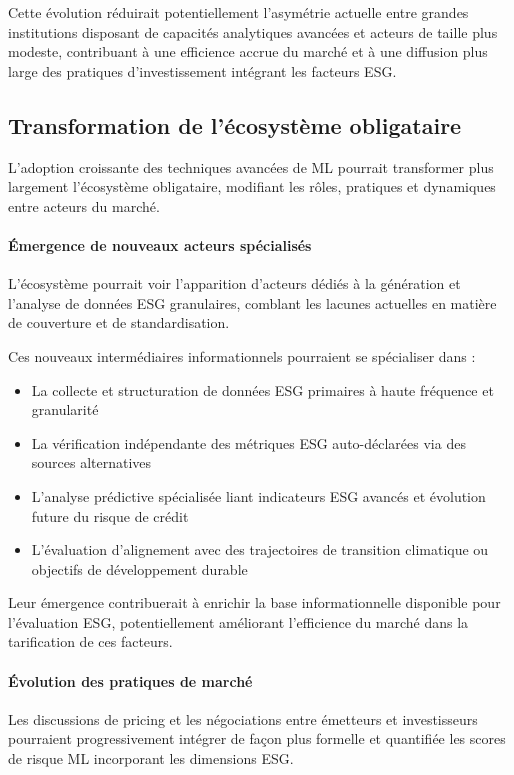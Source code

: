 Cette évolution réduirait potentiellement l'asymétrie actuelle entre grandes institutions disposant de capacités analytiques avancées et acteurs de taille plus modeste, contribuant à une efficience accrue du marché et à une diffusion plus large des pratiques d'investissement intégrant les facteurs ESG.

\subsection*{Transformation de l'écosystème obligataire}

L'adoption croissante des techniques avancées de ML pourrait transformer plus largement l'écosystème obligataire, modifiant les rôles, pratiques et dynamiques entre acteurs du marché.

\paragraph{Émergence de nouveaux acteurs spécialisés} 
L'écosystème pourrait voir l'apparition d'acteurs dédiés à la génération et l'analyse de données ESG granulaires, comblant les lacunes actuelles en matière de couverture et de standardisation.

Ces nouveaux intermédiaires informationnels pourraient se spécialiser dans :
\begin{itemize}
    \item La collecte et structuration de données ESG primaires à haute fréquence et granularité
    \item La vérification indépendante des métriques ESG auto-déclarées via des sources alternatives
    \item L'analyse prédictive spécialisée liant indicateurs ESG avancés et évolution future du risque de crédit
    \item L'évaluation d'alignement avec des trajectoires de transition climatique ou objectifs de développement durable
\end{itemize}

Leur émergence contribuerait à enrichir la base informationnelle disponible pour l'évaluation ESG, potentiellement améliorant l'efficience du marché dans la tarification de ces facteurs.

\paragraph{Évolution des pratiques de marché} 
Les discussions de pricing et les négociations entre émetteurs et investisseurs pourraient progressivement intégrer de façon plus formelle et quantifiée les scores de risque ML incorporant les dimensions ESG.


